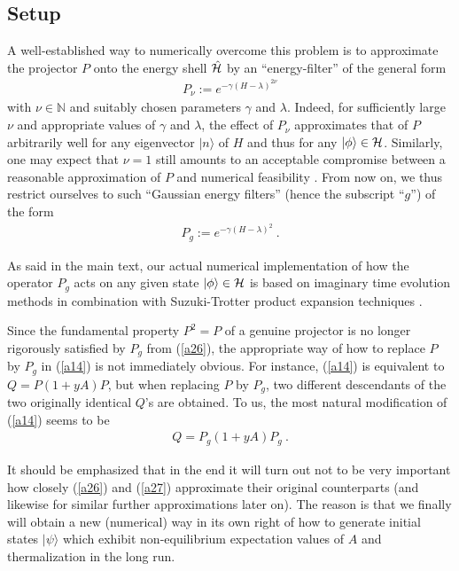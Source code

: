 \documentclass[twocolumn,aps,prb,floatfix,superscriptaddress]{revtex4-2}
\newcommand{\<}{\left\langle}	%
\renewcommand{\>}{\right\rangle}	%
\newcommand{\NN}{{\mathbb N}}
\newcommand{\Pg}{P_{\! g}}
\newcommand{\hr}{{\cal H}}
\begin{document}
\subsection{Setup}

A well-established way to numerically overcome 
this problem \cite{filter}
is to approximate the projector $P$
onto the energy shell $\hat \hr$ by an 
``energy-filter'' of the general form
\begin{eqnarray}
P_\nu:=e^{-\gamma(H-\lambda)^{2\nu}}
\label{a25}
\end{eqnarray}
with $\nu\in\NN$
and suitably chosen parameters
$\gamma$ and $\lambda$.
Indeed, for sufficiently large $\nu$ and appropriate
values of $\gamma$ and $\lambda$, the effect 
of $P_{\nu}$ approximates that of $P$ arbitrarily
well for any eigenvector $|n\rangle$ of $H$
and thus for any $|\phi\rangle\in\hr$.
Similarly, one may expect that $\nu=1$
still amounts to an acceptable compromise 
between a reasonable approximation of $P$
and numerical feasibility \cite{filter}.
From now on, we thus restrict ourselves to 
such ``Gaussian energy filters'' (hence the subscript ``$g$'')
of the form
\begin{eqnarray}
\Pg :=e^{-\gamma (H-\lambda)^{2}}
\ .
\label{a26}
\end{eqnarray}

As said in the main text, our actual numerical
implementation of how the operator $\Pg$ acts
on any given state $|\phi\rangle\in\hr$ is based
on imaginary time evolution methods in combination 
with Suzuki-Trotter product expansion techniques \cite{rae04}.

Since the fundamental property $P^2=P$ of a genuine 
projector is no longer rigorously satisfied by $\Pg$
from (\ref{a26}),
the appropriate way of how to replace $P$ by $\Pg$ 
in (\ref{a14}) is not immediately obvious.
For instance, (\ref{a14}) is equivalent to
$Q=P(1+yA)P$, but when replacing $P$ by $\Pg$,
two different descendants of the two originally 
identical $Q$'s are obtained.
To us, the most natural modification of (\ref{a14})
seems to be 
\begin{eqnarray}
Q=\Pg (1+yA)\Pg 
\ .
\label{a27}
\end{eqnarray}

It should be emphasized that in the end it will turn 
out not to be very important how closely (\ref{a26})
and (\ref{a27}) approximate their original
counterparts
(and likewise for similar further approximations later on).
The reason is that we finally will obtain a new
(numerical) way in its own right of how to generate
initial states $|\psi\rangle$ which exhibit
non-equilibrium
expectation values of  $A$
and thermalization in the long run.
\end{document}
